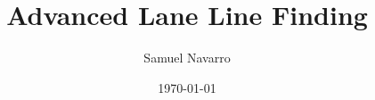 \documentclass[11pt, a4paper]{article}
\begin{document}
\title{Advanced Lane Line Finding}
\author{Samuel Navarro}
\date{\today}
\maketitle
	
\end{document}
